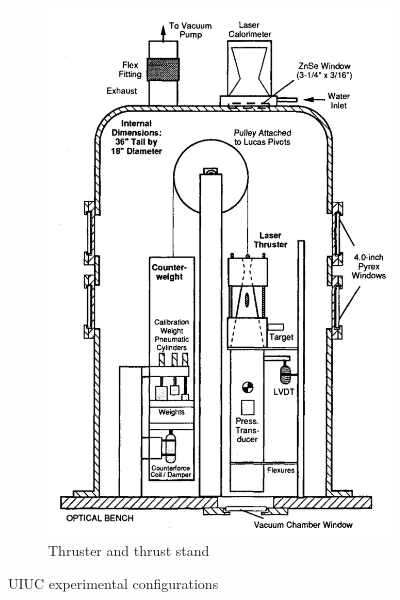\begin{figure}[h]
\begin{subfigure}[b]{0.43\textwidth}
                \includegraphics[width=\textwidth]{assets/2 background/uiuc_thrustStand.png}
                \caption{Thruster and thrust stand \cite{blackLaserPropulsion10kW1995}}
                \label{fig:4_uiucThrust}
            \end{subfigure}
            \caption{UIUC experimental configurations}
            \label{fig:4_uiuc}
        \end{figure}
        

